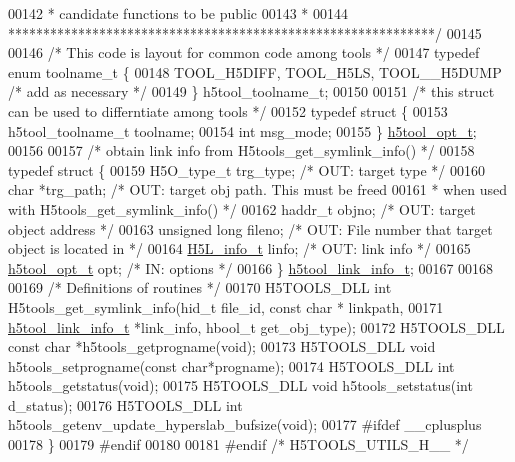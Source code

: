 \begin{DoxyCode}
00142 \textcolor{comment}{ * candidate functions to be public}
00143 \textcolor{comment}{ *}
00144 \textcolor{comment}{ *************************************************************/}
00145 
00146 \textcolor{comment}{/* This code is layout for common code among tools */}
00147 \textcolor{keyword}{typedef} \textcolor{keyword}{enum} toolname\_t \{
00148     TOOL\_H5DIFF, TOOL\_H5LS, TOOL\_\_H5DUMP \textcolor{comment}{/* add as necessary */}
00149 \} h5tool\_toolname\_t;
00150 
00151 \textcolor{comment}{/* this struct can be used to differntiate among tools */}
00152 \textcolor{keyword}{typedef} \textcolor{keyword}{struct }\{
00153     h5tool\_toolname\_t toolname;
00154     \textcolor{keywordtype}{int} msg\_mode;
00155 \} \hyperlink{structh5tool__opt__t}{h5tool\_opt\_t};
00156 
00157 \textcolor{comment}{/* obtain link info from H5tools\_get\_symlink\_info() */}
00158 \textcolor{keyword}{typedef} \textcolor{keyword}{struct }\{
00159     H5O\_type\_t  trg\_type;  \textcolor{comment}{/* OUT: target type */}
00160     \textcolor{keywordtype}{char} *trg\_path;        \textcolor{comment}{/* OUT: target obj path. This must be freed }
00161 \textcolor{comment}{                            *      when used with H5tools\_get\_symlink\_info() */}
00162     haddr\_t     objno;     \textcolor{comment}{/* OUT: target object address */}
00163     \textcolor{keywordtype}{unsigned} \textcolor{keywordtype}{long}  fileno; \textcolor{comment}{/* OUT: File number that target object is located in */}
00164     \hyperlink{struct_h5_l__info__t}{H5L\_info\_t} linfo;      \textcolor{comment}{/* OUT: link info */}
00165     \hyperlink{structh5tool__opt__t}{h5tool\_opt\_t} opt;      \textcolor{comment}{/* IN: options */}
00166 \} \hyperlink{structh5tool__link__info__t}{h5tool\_link\_info\_t};
00167 
00168 
00169 \textcolor{comment}{/* Definitions of routines */}
00170 H5TOOLS\_DLL \textcolor{keywordtype}{int} H5tools\_get\_symlink\_info(hid\_t file\_id, \textcolor{keyword}{const} \textcolor{keywordtype}{char} * linkpath,
00171     \hyperlink{structh5tool__link__info__t}{h5tool\_link\_info\_t} *link\_info, hbool\_t get\_obj\_type);
00172 H5TOOLS\_DLL \textcolor{keyword}{const} \textcolor{keywordtype}{char} *h5tools\_getprogname(\textcolor{keywordtype}{void});
00173 H5TOOLS\_DLL \textcolor{keywordtype}{void}     h5tools\_setprogname(\textcolor{keyword}{const} \textcolor{keywordtype}{char}*progname);
00174 H5TOOLS\_DLL \textcolor{keywordtype}{int}      h5tools\_getstatus(\textcolor{keywordtype}{void});
00175 H5TOOLS\_DLL \textcolor{keywordtype}{void}     h5tools\_setstatus(\textcolor{keywordtype}{int} d\_status);
00176 H5TOOLS\_DLL \textcolor{keywordtype}{int} h5tools\_getenv\_update\_hyperslab\_bufsize(\textcolor{keywordtype}{void});
00177 \textcolor{preprocessor}{#ifdef \_\_cplusplus}
00178 \}
00179 \textcolor{preprocessor}{#endif}
00180 
00181 \textcolor{preprocessor}{#endif  }\textcolor{comment}{/* H5TOOLS\_UTILS\_H\_\_ */}\textcolor{preprocessor}{}
\end{DoxyCode}
